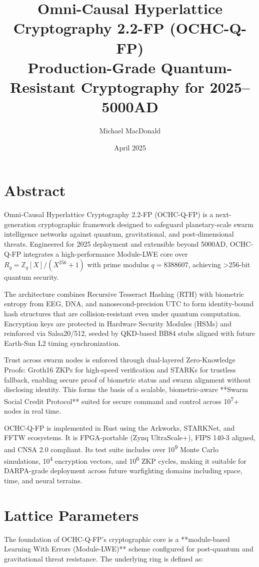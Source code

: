 \documentclass[12pt]{article}
\title{\textbf{Omni-Causal Hyperlattice Cryptography 2.2-FP (OCHC-Q-FP)}\\
\large Production-Grade Quantum-Resistant Cryptography for 2025–5000AD}
\author{Michael MacDonald}
\date{April 2025}
\begin{document}
\maketitle

\section*{Abstract}

Omni-Causal Hyperlattice Cryptography 2.2-FP (OCHC-Q-FP) is a next-generation cryptographic framework designed to safeguard planetary-scale swarm intelligence networks against quantum, gravitational, and post-dimensional threats. Engineered for 2025 deployment and extensible beyond 5000AD, OCHC-Q-FP integrates a high-performance Module-LWE core over \( R_q = \mathbb{Z}_q[X]/(X^{256}+1) \) with prime modulus \( q = 8388607 \), achieving >256-bit quantum security.

The architecture combines Recursive Tesseract Hashing (RTH) with biometric entropy from EEG, DNA, and nanosecond-precision UTC to form identity-bound hash structures that are collision-resistant even under quantum computation. Encryption keys are protected in Hardware Security Modules (HSMs) and reinforced via Salsa20/512, seeded by QKD-based BB84 stubs aligned with future Earth-Sun L2 timing synchronization.

Trust across swarm nodes is enforced through dual-layered Zero-Knowledge Proofs: Groth16 ZKPs for high-speed verification and STARKs for trustless fallback, enabling secure proof of biometric status and swarm alignment without disclosing identity. This forms the basis of a scalable, biometric-aware **Swarm Social Credit Protocol** suited for secure command and control across 10\textsuperscript{7}+ nodes in real time.

OCHC-Q-FP is implemented in Rust using the Arkworks, STARKNet, and FFTW ecosystems. It is FPGA-portable (Zynq UltraScale+), FIPS 140-3 aligned, and CNSA 2.0 compliant. Its test suite includes over 10\textsuperscript{9} Monte Carlo simulations, 10\textsuperscript{4} encryption vectors, and 10\textsuperscript{6} ZKP cycles, making it suitable for DARPA-grade deployment across future warfighting domains including space, time, and neural terrains.


\section*{Lattice Parameters}

The foundation of OCHC-Q-FP's cryptographic core is a **module-based Learning With Errors (Module-LWE)** scheme configured for post-quantum and gravitational threat resistance. The underlying ring is defined as:
\end{document}
